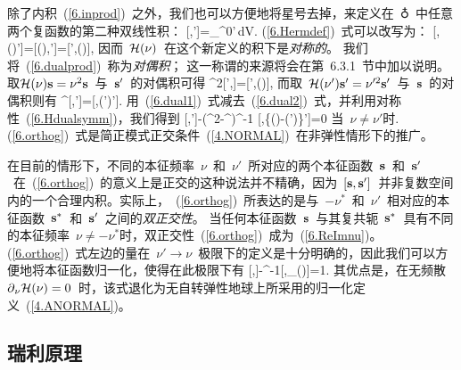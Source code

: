 除了内积~(\ref{6.inprod})~之外，我们也可以方便地将星号去掉，来定义在~$\earth$~中任意两个复函数的第二种双线性积：
\eq
\label{6.dualprod}
[\bs,\bs']=\int_{\subearth}\rho^0\bs\cdot\bs'\,dV.
\en
(\ref{6.Hermdef})~式可以改写为：
\eq
\label{6.Hdualsymm}
[\bs,\sH(\nu)\bs']=[\sH(\nu)\bs,\bs']=[\bs',\sH(\nu)\bs],
\en
因而~$\mbox{$\cal H$}(\nu)$~在这个新定义的积下是{\em 对称的\/}。
%
%
我们将~(\ref{6.dualprod})~称为{\em 对偶积\/}；
%
这一称谓的来源将会在第~6.3.1~节中加以说明。取$\mbox{$\cal H$}(\nu)\mbox{${\bf s}$}=\nu^2\mbox{${\bf s}$}$~与~$\mbox{${\bf s}$}'$~的对偶积可得
\eq
\label{6.dual1}
\nu^2[\bs',\bs]=[\bs',\sH(\nu)\bs],
\en
而取~$\mbox{$\cal H$}(\nu')\mbox{${\bf s}$}'=\nu^{\prime 2}\mbox{${\bf s}$}'$~与~$\mbox{${\bf s}$}$~的对偶积则有
\eq
\label{6.dual2}
\nu^{}[\bs,\bs']=[\bs,\sH(\nu')\bs'].
\en
用~(\ref{6.dual1})~式减去~(\ref{6.dual2})~式，并利用对称性~(\ref{6.Hdualsymm})，我们得到
\eq
\label{6.orthog}
[\bs,\bs']-(\nu^2-\nu^{})^{-1}
[\bs,\{\sH(\nu)-\sH(\nu')\}\bs']=0
\quad\mbox{当 $\nu\neq\nu'$时}.
\en
(\ref{6.orthog})~式是简正模式正交条件~(\ref{4.NORMAL})~在非弹性情形下的推广。

在目前的情形下，不同的本征频率~$\nu$~和~$\nu'$~所对应的两个本征函数~$\mbox{${\bf s}$}$~和~$\mbox{${\bf s}$}'$~在~(\ref{6.orthog})~的意义上是正交的这种说法并不精确，因为~$[\mbox{${\bf s}$},\mbox{${\bf s}$}']$~并非复数空间内的一个合理内积。实际上，~(\ref{6.orthog})~所表达的是与~$-\nu^*$~和~$\nu'$~相对应的本征函数~$\mbox{${\bf s}$}^*$~和~$\mbox{${\bf s}$}'$~之间的{\em 双正交性\/}。
%
当任何本征函数~$\mbox{${\bf s}$}$~与其复共轭~$\mbox{${\bf s}$}^*$~具有不同的本征频率~$\nu\neq -\nu^*$时，双正交性~(\ref{6.orthog})~成为~(\ref{6.ReImnu})。(\ref{6.orthog})~式左边的量在~$\nu'\rightarrow\nu$~极限下的定义是十分明确的，因此我们可以方便地将本征函数归一化，使得在此极限下有
%
\eq
\label{6.normal}
[\bs,\bs]-\half\nu^{-1}[\bs,\p_{\nu}\sH(\nu)\bs]=1.
\en
其优点是，在无频散~$\mbox{$\partial$}_{\nu}\mbox{$\cal H$}(\nu)=0$~时，该式退化为无自转弹性地球上所采用的归一化定义~(\ref{4.ANORMAL})。

\subsection{瑞利原理}
%
\label{6.sec.Rayprin}

